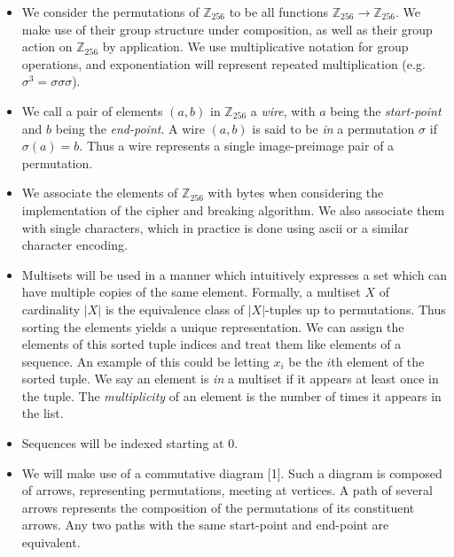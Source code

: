 \documentclass[12pt]{article}
\newcommand{\bytes}{\mathbb{Z}_{256}}
\theoremstyle{definition}
\theoremstyle{remark}
\theoremstyle{remark}
\begin{document}
\begin{itemize}

\item
We consider the permutations of $\bytes$ to be all functions $\bytes \to \bytes$. We make use of their group structure under composition, as well as their group action on $\bytes$ by application. We use multiplicative notation for group operations, and exponentiation will represent repeated multiplication (e.g. $\sigma^3=\sigma \sigma \sigma$).
\item
We call a pair of elements $(a,b)$ in $\bytes$ a \emph{wire}, with $a$ being the \emph{start-point} and $b$ being the \emph{end-point}. A wire $(a,b)$ is said to be \emph{in} a permutation $\sigma$ if $\sigma(a)=b$. Thus a wire represents a single image-preimage pair of a permutation.

\item
We associate the elements of $\bytes$ with bytes when considering the implementation of the cipher and breaking algorithm. We also associate them with single characters, which in practice is done using ascii or a similar character encoding.

\item
Multisets will be used in a manner which intuitively expresses a set which can have multiple copies of the same element. Formally, a multiset $X$ of cardinality $|X|$ is the equivalence class of $|X|$-tuples up to permutations. Thus sorting the elements yields a unique representation. We can assign the elements of this sorted tuple indices and treat them like elements of a sequence. An example of this could be letting $x_i$ be the $i$th element of the sorted tuple. We say an element is \emph{in} a multiset if it appears at least once in the tuple. The \emph{multiplicity} of an element is the number of times it appears in the list. 

\item
Sequences will be indexed starting at 0. 

\item
We will make use of a commutative diagram [1]. Such a diagram is composed of arrows, representing permutations, meeting at vertices. A path of several arrows represents the composition of the permutations of its constituent arrows. Any two paths with the same start-point and end-point are equivalent.


\end{itemize}
\end{document}
